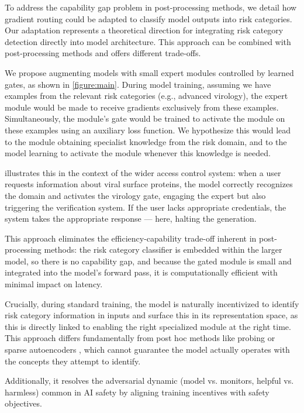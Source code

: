 \documentclass{article}
\theoremstyle{plain}
\theoremstyle{definition}
\theoremstyle{remark}
\begin{document}
To address the capability gap problem in post-processing methods, we
detail how gradient routing \cite{cloud2024gradientroutingmaskinggradients}
could be adapted to classify model outputs into risk categories.
Our adaptation represents a theoretical direction for integrating
risk category detection directly into model architecture.
This approach can be combined with post-processing methods and offers
different trade-offs.

We propose augmenting models with small expert modules controlled by
learned gates, as shown in \cref{figure:main}.
During model training, assuming we have examples from the relevant
risk categories (e.g., advanced virology), the expert module would be
made to receive gradients exclusively from these examples.
Simultaneously, the module's gate would be trained to activate the
module on these examples using an auxiliary loss function.
We hypothesize this would lead to the module obtaining specialist
knowledge from the risk domain, and to the model learning to activate
the module whenever this knowledge is needed.

 illustrates this in the context of the wider
access control system: when a user requests information about viral
surface proteins, the model correctly recognizes the domain and
activates the virology gate, engaging the expert but also triggering
the verification system. If the user lacks appropriate credentials,
the system takes the appropriate response --- here, halting the generation.

This approach eliminates the efficiency-capability
trade-off inherent in post-processing methods: the risk category
classifier is embedded within the larger model, so there is no
capability gap, and because the gated module is small and integrated
into the model's forward pass, it is computationally efficient with
minimal impact on latency.

Crucially, during standard training, the model is naturally incentivized to identify risk category information in inputs and surface this in its representation space, as this is directly linked to enabling the right specialized module at the right time.
This approach differs fundamentally from post hoc methods like probing or sparse autoencoders \cite{cunningham2023sparseautoencodershighlyinterpretable}, which cannot guarantee the model actually operates with the concepts they attempt to identify.

Additionally, it resolves the adversarial dynamic (model vs. monitors, helpful vs. harmless) common in AI safety by aligning training incentives with safety objectives.
\end{document}
